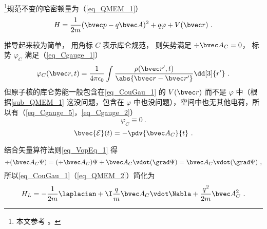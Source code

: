 

\footnote{本文参考 \cite{Bransden}。}规范不变的哈密顿量为（\autoref{eq_QMEM_1}）
\begin{equation}\label{eq_CouGau_1}
H = \frac{1}{2m} (\bvec p - q\bvec A)^2 + q\varphi + V(\bvec r)~.
\end{equation}

推导起来较为简单， 用角标 $C$ 表示库仑规范， 则矢势满足 $\div \bvec A_C = 0$， 标势 $\varphi_C$ 满足（\autoref{eq_Cgauge_1}）
\begin{equation}
\varphi_C(\bvec r, t) = \frac{1}{4\pi\epsilon_0} \int \frac{\rho(\bvec r', t)}{\abs{\bvec r - \bvec r'}} \dd[3]{r'}~.
\end{equation}
但原子核的库仑势能一般包含在\autoref{eq_CouGau_1} 的 $V(\bvec r)$ 而不是 $\varphi$ 中（根据\autoref{sub_QMEM_1} 这没问题，包含在 $\varphi$ 中也没问题），空间中也无其他电荷，所以有（\autoref{eq_Cgauge_5}，\autoref{eq_Cgauge_2}）
\begin{equation}\label{eq_CouGau_2}
\varphi_C \equiv 0~.
\end{equation}
\begin{equation}\label{eq_CouGau_3}
\bvec {\mathcal E}(t) = -\pdv{\bvec A_C}{t}~.
\end{equation}

结合矢量算符法则\autoref{eq_VopEq_1}  得
\begin{equation}
\div (\bvec A_C \Psi) = (\div \bvec A_C) \Psi + \bvec A_C \vdot (\grad \Psi) = \bvec A_C \vdot (\grad \Psi)~,
\end{equation}
所以\autoref{eq_CouGau_1}（\autoref{eq_QMEM_2}）简化为
\begin{equation}\label{eq_CouGau_4}
H_L = -\frac{1}{2m} \laplacian + \I \frac{q}{m} \bvec A_C \vdot \Nabla + \frac{q^2}{2m} \bvec A_C^2~.
\end{equation}
